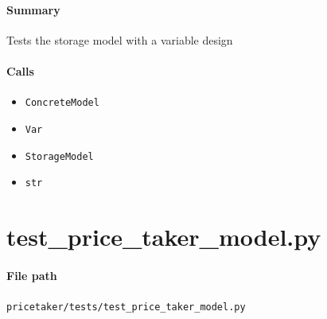 \documentclass[11pt]{report}
\begin{document}
\paragraph{Summary} Tests the storage model with a variable design
\paragraph{Calls}
\begin{itemize}[leftmargin=*]
  \item \texttt{ConcreteModel}
  \item \texttt{Var}
  \item \texttt{StorageModel}
  \item \texttt{str}
\end{itemize}

\section{test\_price\_taker\_model.py}
\label{file:pricetaker-tests-test_price_taker_model.py}
\paragraph{File path} \texttt{pricetaker/tests/test\_price\_taker\_model.py}
\end{document}
